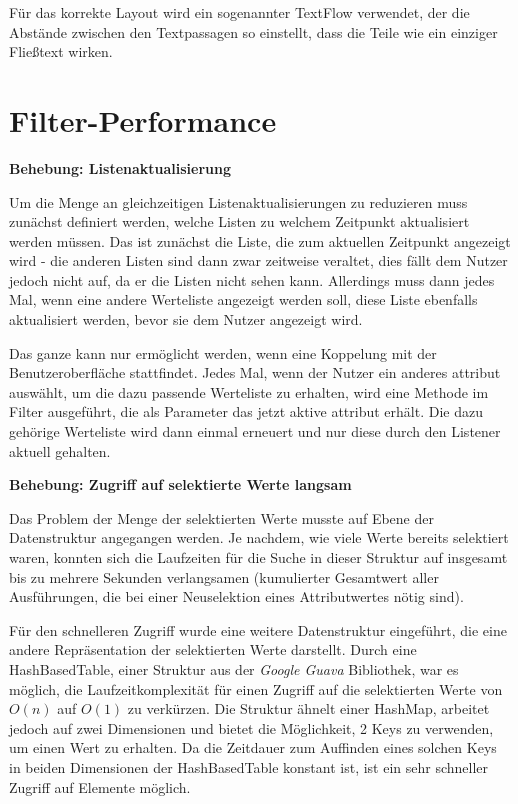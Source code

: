 Für das korrekte Layout wird ein sogenannter TextFlow verwendet, der die Abstände zwischen den Textpassagen so einstellt, dass die Teile wie ein einziger Fließtext wirken.

\section{Filter-Performance} \label{sec:verbFilterPerformance}
\textbf{Behebung: Listenaktualisierung}

Um die Menge an gleichzeitigen Listenaktualisierungen zu reduzieren muss zunächst definiert werden, welche Listen zu welchem Zeitpunkt aktualisiert werden müssen. Das ist zunächst die Liste, die zum aktuellen Zeitpunkt angezeigt wird - die anderen Listen sind dann zwar zeitweise veraltet, dies fällt dem Nutzer jedoch nicht auf, da er die Listen nicht sehen kann. Allerdings muss dann jedes Mal, wenn eine andere Werteliste angezeigt werden soll, diese Liste ebenfalls aktualisiert werden, bevor sie dem Nutzer angezeigt wird.

Das ganze kann nur ermöglicht werden, wenn eine Koppelung mit der Benutzeroberfläche stattfindet. Jedes Mal, wenn der Nutzer ein anderes \gls{attribut} auswählt, um die dazu passende Werteliste zu erhalten, wird eine Methode im Filter ausgeführt, die als Parameter das jetzt aktive \gls{attribut} erhält. Die dazu gehörige Werteliste wird dann einmal erneuert und nur diese durch den Listener aktuell gehalten.

\textbf{Behebung: Zugriff auf selektierte Werte langsam}

Das Problem der Menge der selektierten Werte musste auf Ebene der Datenstruktur angegangen werden. Je nachdem, wie viele Werte bereits selektiert waren, konnten sich die Laufzeiten für die Suche in dieser Struktur auf insgesamt bis zu mehrere Sekunden verlangsamen (kumulierter Gesamtwert aller Ausführungen, die bei einer Neuselektion eines Attributwertes nötig sind).

Für den schnelleren Zugriff wurde eine weitere Datenstruktur eingeführt, die eine andere Repräsentation der selektierten Werte darstellt. Durch eine HashBasedTable, einer Struktur aus der \textit{Google Guava} Bibliothek, war es möglich, die Laufzeitkomplexität für einen Zugriff auf die selektierten Werte von $O(n)$ auf $O(1)$ zu verkürzen. Die Struktur ähnelt einer HashMap, arbeitet jedoch auf zwei Dimensionen und bietet die Möglichkeit, 2 Keys zu verwenden, um einen Wert zu erhalten. Da die Zeitdauer zum Auffinden eines solchen Keys in beiden Dimensionen der HashBasedTable konstant ist, ist ein sehr schneller Zugriff auf Elemente möglich.


